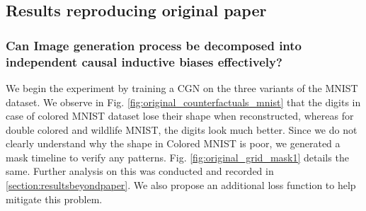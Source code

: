 
\subsection{Results reproducing original paper}

\subsubsection{Can Image generation process be decomposed into independent causal inductive biases effectively?}

We begin the experiment by training a CGN on the three variants of the MNIST dataset. We observe in Fig. \ref{fig:original_counterfactuals_mnist} that the digits in case of colored MNIST dataset lose their shape when reconstructed, whereas for double colored and wildlife MNIST, the digits look much better. Since we do not clearly understand why the shape in Colored MNIST is poor, we generated a mask timeline to verify any patterns. Fig. \ref{fig:original_grid_mask1} details the same. Further analysis on this was conducted and recorded in \ref{section:resultsbeyondpaper}. We also propose an additional loss function to help mitigate this problem.

% 






